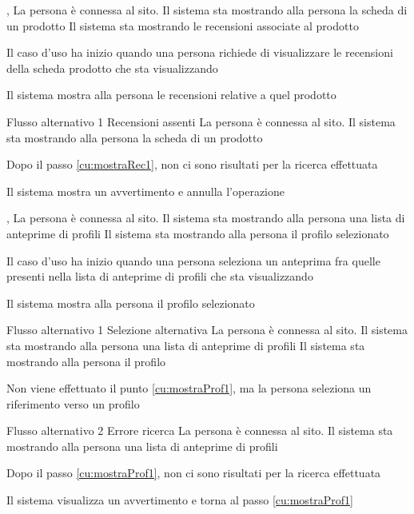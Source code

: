 
{, }
{La persona è connessa al sito. Il sistema sta mostrando alla persona la scheda di un prodotto}
{Il sistema sta mostrando le recensioni associate al prodotto}
{\begin{enumCU}
	\item Il caso d'uso ha inizio quando una persona richiede di visualizzare le recensioni della scheda prodotto che sta visualizzando\label{cu:mostraRec1}
	\item Il sistema mostra alla persona le recensioni relative a quel prodotto
\end{enumCU}
}
%
{Flusso alternativo 1}%
{Recensioni assenti}%
{La persona è connessa al sito. Il sistema sta mostrando alla persona la scheda di un prodotto}%
{\postNulle}%
{\begin{enumCU}
		\item Dopo il passo \ref{cu:mostraRec1}, non ci sono risultati per la ricerca effettuata
		\item Il sistema mostra un avvertimento e annulla l'operazione
\end{enumCU}}


{, }
{La persona è connessa al sito. Il sistema sta mostrando alla persona una lista di anteprime di profili}
{Il sistema sta mostrando alla persona il profilo selezionato}
{\begin{enumCU}
	\item Il caso d'uso ha inizio quando una persona seleziona un anteprima fra quelle presenti nella lista di anteprime di profili che sta visualizzando\label{cu:mostraProf1}
	\item Il sistema mostra alla persona il profilo selezionato
\end{enumCU}
}
%
{Flusso alternativo 1}%
{Selezione alternativa}%
{La persona è connessa al sito. Il sistema sta mostrando alla persona una lista di anteprime di profili}%
{Il sistema sta mostrando alla persona il profilo}%
{\begin{enumCU}
		\item Non viene effettuato il punto \ref{cu:mostraProf1}, ma la persona seleziona un \gls{riferimento} verso un profilo
\end{enumCU}}%
%
{Flusso alternativo 2}%
{Errore ricerca}%
{La persona è connessa al sito. Il sistema sta mostrando alla persona una lista di anteprime di profili}%
{\postNulle}%
{\begin{enumCU}
		\item Dopo il passo \ref{cu:mostraProf1}, non ci sono risultati per la ricerca effettuata
		\item Il sistema visualizza un avvertimento e torna al passo \ref{cu:mostraProf1}
\end{enumCU}}%

